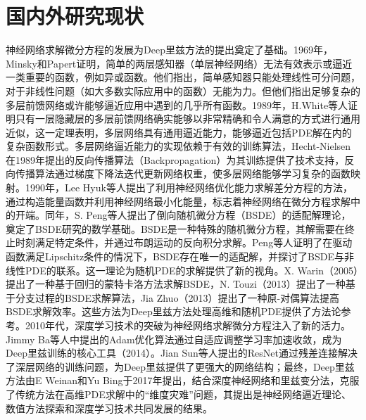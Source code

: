 \documentclass[engineeringmaster]{hquThesis}
\begin{document}
\section{国内外研究现状}
神经网络求解微分方程的发展为Deep里兹方法的提出奠定了基础。1969年，Minsky和Papert证明，简单的两层感知器（单层神经网络）无法有效表示或逼近一类重要的函数，例如异或函数。他们指出，简单感知器只能处理线性可分问题，对于非线性问题（如大多数实际应用中的函数）无能为力。但他们指出足够复杂的多层前馈网络或许能够逼近应用中遇到的几乎所有函数。1989年，H.White等人证明只有一层隐藏层的多层前馈网络确实能够以非常精确和令人满意的方式进行通用近似，这一定理表明，多层网络具有通用逼近能力，能够逼近包括PDE解在内的复杂函数形式。多层网络逼近能力的实现依赖于有效的训练算法，Hecht-Nielsen在1989年提出的反向传播算法（Backpropagation）为其训练提供了技术支持，反向传播算法通过梯度下降法迭代更新网络权重，使多层网络能够学习复杂的函数映射。1990年，Lee Hyuk等人提出了利用神经网络优化能力求解差分方程的方法，通过构造能量函数并利用神经网络最小化能量，标志着神经网络在微分方程求解中的开端。同年，S. Peng等人提出了倒向随机微分方程（BSDE）的适配解理论，奠定了BSDE研究的数学基础。BSDE是一种特殊的随机微分方程，其解需要在终止时刻满足特定条件，并通过布朗运动的反向积分求解。Peng等人证明了在驱动函数满足Lipschitz条件的情况下，BSDE存在唯一的适配解，并探讨了BSDE与非线性PDE的联系。这一理论为随机PDE的求解提供了新的视角。X. Warin（2005）提出了一种基于回归的蒙特卡洛方法求解BSDE，N. Touzi（2013）提出了一种基于分支过程的BSDE求解算法，Jia Zhuo（2013）提出了一种原-对偶算法提高BSDE求解效率。这些方法为Deep里兹方法处理高维和随机PDE提供了方法论参考。2010年代，深度学习技术的突破为神经网络求解微分方程注入了新的活力。Jimmy Ba等人中提出的Adam优化算法通过自适应调整学习率加速收敛，成为Deep里兹训练的核心工具（2014）。Jian Sun等人提出的ResNet通过残差连接解决了深层网络的训练问题，为Deep里兹提供了更强大的网络结构；最终，Deep里兹方法由E Weinan和Yu Bing于2017年提出，结合深度神经网络和里兹变分法，克服了传统方法在高维PDE求解中的“维度灾难”问题，其提出是神经网络逼近理论、数值方法探索和深度学习技术共同发展的结果。
\end{document}
